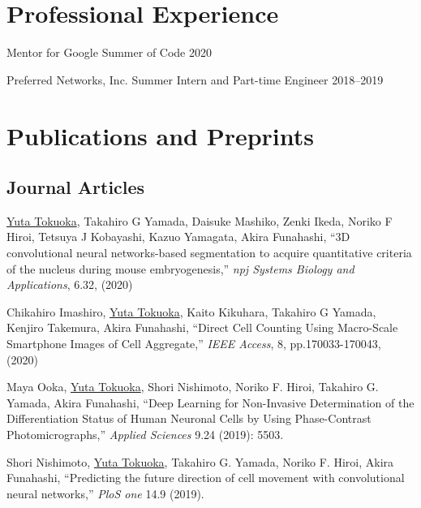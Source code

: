 \documentclass[letterpaper]{article}
\renewenvironment{itemize}{
  \begin{list}{}{
    \setlength{\leftmargin}{1.5em}
  }
}{
  \end{list}
}
\begin{document}
\section*{\bf Professional Experience}
\vspace{-0.6cm}
\hrulefill

\begin{itemize}
 \item Mentor for Google Summer of Code 2020
 \item Preferred Networks, Inc. Summer Intern and Part-time Engineer 2018--2019
       \\
\end{itemize}


\section*{\bf Publications and Preprints}
\vspace{-0.6cm}
\hrulefill
\vspace{-0.3cm}

\subsection*{\bf Journal Articles}

\begin{itemize}
 \item \underline{Yuta Tokuoka}, Takahiro G Yamada, Daisuke Mashiko,
       Zenki Ikeda, Noriko F Hiroi, Tetsuya J Kobayashi, Kazuo Yamagata,
       Akira Funahashi, ``3D convolutional neural networks-based
       segmentation to acquire quantitative criteria of the nucleus
       during mouse embryogenesis,'' {\itshape npj Systems Biology and
       Applications}, 6.32, (2020)

 \item Chikahiro Imashiro, \underline{Yuta Tokuoka}, Kaito Kikuhara,
       Takahiro G Yamada, Kenjiro Takemura, Akira Funahashi, ``Direct
       Cell Counting Using Macro-Scale Smartphone Images of Cell
       Aggregate,'' {\itshape IEEE Access}, 8, pp.170033-170043, (2020)

 \item Maya Ooka, \underline{Yuta Tokuoka}, Shori Nishimoto, Noriko
       F. Hiroi, Takahiro G. Yamada, Akira Funahashi, ``Deep Learning
       for Non-Invasive Determination of the Differentiation Status of
       Human Neuronal Cells by Using Phase-Contrast Photomicrographs,''
       {\itshape Applied Sciences} 9.24 (2019): 5503.

 \item Shori Nishimoto, \underline{Yuta Tokuoka}, Takahiro G. Yamada,
       Noriko F. Hiroi, Akira Funahashi, ``Predicting the future
       direction of cell movement with convolutional neural networks,''
       {\itshape PloS one} 14.9 (2019).
\end{itemize}
\end{document}
